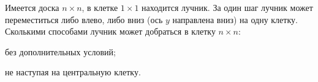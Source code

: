 Имеется доска $n \times n$, в клетке $1 \times 1$ находится лучник. За один шаг лучник может
переместиться либо влево, либо вниз (ось $y$ направлена вниз) на одну клетку. Сколькими способами лучник
может добраться в клетку $n \times n$:
\begin{enumcyr}
    \item без дополнительных условий;
    \item не наступая на центральную клетку.
\end{enumcyr}